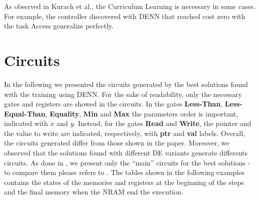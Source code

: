 As observed in Kurach et al., the Curriculum Learning is necessary in some cases. For example, the controller discovered with DENN that reached cost zero with the task Access generalize perfectly. 


\section{Circuits}\label{subsec:circuits}
In the following we presented the circuits generated by the best solutions found with  the training using DENN. For the sake of readability, only the necessary gates and registers are showed in the circuits. In the gates \textbf{Less-Than}, \textbf{Less-Equal-Than}, \textbf{Equality}, \textbf{Min} and \textbf{Max} the parameters order is important, indicated with $x$ and $y$. Instead, for the gates \textbf{Read} and \textbf{Write}, the pointer and the value to write are indicated, respectively, with \textbf{ptr} and \textbf{val} labels.\newline\newline
Overall, the circuits generated differ from those shown in the paper. Moreover, we observed that the solutions found with different DE variants generate differents circuits. As done in \cite{NRAM:2016}, we present only the ``main'' circuits for the best solutions - to compare them please refers to \cite{NRAM:2016}. The tables shown in the following examples contains the states of the memories and registers at the beginning of the steps and the final memory when the NRAM end the execution.
\clearpage
